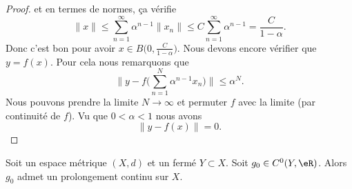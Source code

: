 \begin{proof}
    et en termes de normes, ça vérifie
    \begin{equation}
        \| x \|\leq\sum_{n=1}^{\infty}\alpha^{n-1}\| x_n \|\leq C\sum_{n=1}^{\infty}\alpha^{n-1}=\frac{ C }{ 1-\alpha }.
    \end{equation}
    Donc c'est bon pour avoir \( x\in B\big( 0,\frac{ C }{ 1-\alpha } \big)\). Nous devons encore vérifier que \( y=f(x)\). Pour cela nous remarquons que
    \begin{equation}
        \| y-f\Big( \sum_{n=1}^N\alpha^{n-1}x_n \Big) \|\leq \alpha^N.
    \end{equation}
    Nous pouvons prendre la limite \( N\to \infty\) et permuter \( f\) avec la limite (par continuité de \( f\)). Vu que \( 0<\alpha<1\) nous avons
    \begin{equation}
        \| y-f(x) \|=0.
    \end{equation}
\end{proof}

\begin{theorem}   \label{ThoFFQooGvcLzJ}
    Soit un espace métrique \( (X,d)\) et un fermé \( Y\subset X\). Soit \( g_0\in C^0(Y,\eR)\). Alors \( g_0\) admet un prolongement continu sur \( X\).
\end{theorem}

